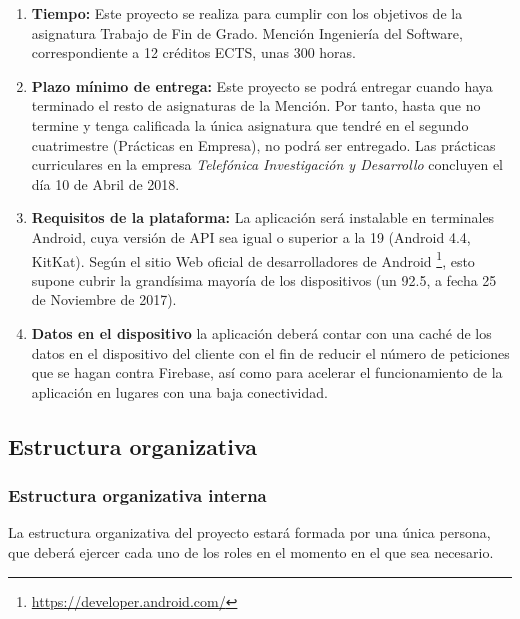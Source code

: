 \documentclass[twoside]{report}
\begin{document}
\begin{enumerate}
\item \textbf{Tiempo:} Este proyecto se realiza para cumplir con los objetivos de la asignatura Trabajo de Fin de Grado. Mención Ingeniería del Software, correspondiente a 12 créditos ECTS, unas 300 horas.

\item \textbf{Plazo mínimo de entrega:} Este proyecto se podrá entregar cuando haya terminado el resto de asignaturas de la Mención. Por tanto, hasta que no termine y tenga calificada la única asignatura que tendré en el segundo cuatrimestre (Prácticas en Empresa), no podrá ser entregado. Las prácticas curriculares en la empresa \textit{Telefónica Investigación y Desarrollo} concluyen el día 10 de Abril de 2018.

\item \textbf{Requisitos de la plataforma:} La aplicación será instalable en terminales Android, cuya versión de API sea igual o superior a la 19 (Android 4.4, KitKat). Según el sitio Web oficial de desarrolladores de Android \footnote{\url{https://developer.android.com/}}, esto supone cubrir la grandísima mayoría de los dispositivos (un 92.5, a fecha 25 de Noviembre de 2017)\cite{androidversiondist}.

\item \textbf{Datos en el dispositivo } la aplicación deberá contar con una caché de los datos en el dispositivo del cliente con el fin de reducir el número de peticiones que se hagan contra Firebase, así como para acelerar el funcionamiento de la aplicación en lugares con una baja conectividad.
\end{enumerate}

\subsection{Estructura organizativa}
\subsubsection{Estructura organizativa interna}
La estructura organizativa del proyecto estará formada por una única persona, que deberá ejercer cada uno de los roles en el momento en el que sea necesario. \cite{upedu} \vspace{0.5cm}
\end{document}
